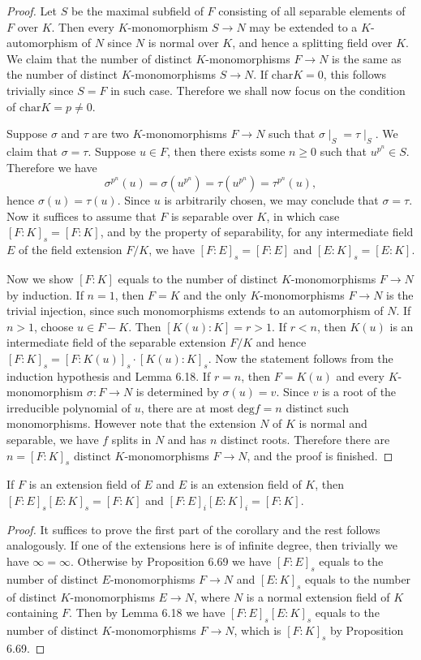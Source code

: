 \begin{proof}
Let $S$ be the maximal subfield of $F$ consisting of all separable elements of $F$ over $K$. Then every $K$-monomorphism $S\to N$ may be extended to a $K$-automorphism of $N$ since $N$ is normal over $K$, and hence a splitting field over $K$. We claim that the number of distinct $K$-monomorphisms $F\to N$ is the same as the number of distinct $K$-monomorphisms $S\to N$. If $\mathrm{char}K=0$, this follows trivially since $S=F$ in such case. Therefore we shall now focus on the condition of $\mathrm{char}K=p\ne 0$.\par
Suppose $\sigma$ and $\tau$ are two $K$-monomorphisms $F\to N$ such that $\sigma\mid_S=\tau\mid_S$. We claim that $\sigma=\tau$. Suppose $u\in F$, then there exists some $n\ge 0$ such that $u^{p^n}\in S$. Therefore we have 
$$
\sigma ^{p^n}\left( u \right) =\sigma \left( u^{p^n} \right) =\tau \left( u^{p^n} \right) =\tau ^{p^n}\left( u \right) ,
$$
hence $\sigma(u)=\tau(u)$. Since $u$ is arbitrarily chosen, we may conclude that $\sigma=\tau$. Now it suffices to assume that $F$ is separable over $K$, in which case $[F:K]_s=[F:K]$, and by the property of separability, for any intermediate field $E$ of the field extension $F/K$, we have $[F:E]_s=[F:E]$ and $[E:K]_s=[E:K]$.\par
Now we show $[F:K]$ equals to the number of distinct $K$-monomorphisms $F\to N$ by induction. If $n=1$, then $F=K$ and the only $K$-monomorphisms $F\to N$ is the trivial injection, since such monomorphisms extends to an automorphism of $N$. If $n>1$, choose $u\in F-K$. Then $[K(u):K]=r>1$. If $r<n$, then $K(u)$ is an intermediate field of the separable extension $F/K$ and hence $[F:K]_s=[F:K(u)]_s\cdot[K(u):K]_s$. Now the statement follows from the induction hypothesis and Lemma 6.18. If $r=n$, then $F=K(u)$ and every $K$-monomorphism $\sigma:F\to N$ is determined by $\sigma(u)=v$. Since $v$ is a root of the irreducible polynomial of $u$, there are at most $\mathrm{deg}f=n$ distinct such monomorphisms. However note that the extension $N$ of $K$ is normal and separable, we have $f$ splits in $N$ and has $n$ distinct roots. Therefore there are $n=[F:K]_s$ distinct $K$-monomorphisms $F\to N$, and the proof is finished.
\end{proof}
\begin{corollary}
If $F$ is an extension field of $E$ and $E$ is an extension field of $K$, then $[F:E]_s[E:K]_s=[F:K]$ and $[F:E]_i[E:K]_i=[F:K]$.
\end{corollary}
\begin{proof}
It suffices to prove the first part of the corollary and the rest follows analogously. If one of the extensions here is of infinite degree, then trivially we have $\infty=\infty$. Otherwise by Proposition 6.69 we have $[F:E]_s$ equals to the number of distinct $E$-monomorphisms $F\to N$ and $[E:K]_s$ equals to the number of distinct $K$-monomorphisms $E\to N$, where $N$ is a normal extension field of $K$ containing $F$. Then by Lemma 6.18 we have $[F:E]_s[E:K]_s$ equals to the number of distinct $K$-monomorphisms $F\to N$, which is $[F:K]_s$ by Proposition 6.69.
\end{proof}
